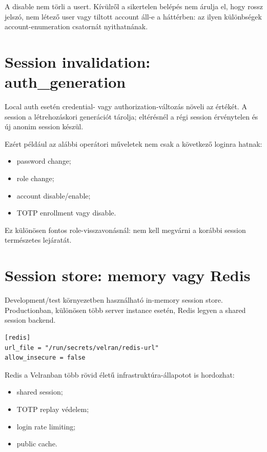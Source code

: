 A disable nem törli a usert. Kívülről a sikertelen belépés nem árulja el, hogy rossz jelszó, nem létező user vagy tiltott account áll-e a háttérben: az ilyen különbségek account-enumeration csatornát nyithatnának.

\section{Session invalidation: auth\_generation}

Local auth esetén credential- vagy authorization-változás növeli az  értékét. A session a létrehozáskori generációt tárolja; eltérésnél a régi session érvénytelen és új anonim session készül.

Ezért például az alábbi operátori műveletek nem csak a következő loginra hatnak:

\begin{itemize}
  \item password change;
  \item role change;
  \item account disable/enable;
  \item TOTP enrollment vagy disable.
\end{itemize}

Ez különösen fontos role-visszavonásnál: nem kell megvárni a korábbi session természetes lejáratát.

\section{Session store: memory vagy Redis}

Development/test környezetben használható in-memory session store. Productionban, különösen több server instance esetén, Redis legyen a shared session backend.

\begin{lstlisting}
[redis]
url_file = "/run/secrets/velran/redis-url"
allow_insecure = false
\end{lstlisting}

Redis a Velranban több rövid életű infrastruktúra-állapotot is hordozhat:

\begin{itemize}
  \item shared session;
  \item TOTP replay védelem;
  \item login rate limiting;
  \item public cache.
\end{itemize}

